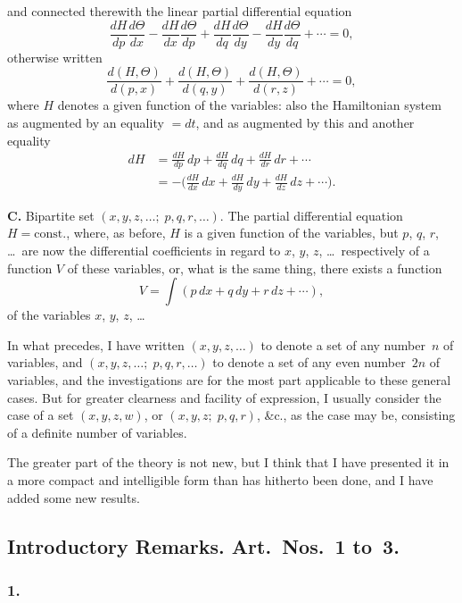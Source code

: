 \documentclass[12pt,a4paper]{article}
\theoremstyle{plain}
\begin{document}
\newpage
\setcounter{page}{114}

and connected therewith the linear partial differential equation
\[
\frac{dH}{dp}\frac{d\Theta}{dx} - \frac{dH}{dx}\frac{d\Theta}{dp} + \frac{dH}{dq}\frac{d\Theta}{dy} - \frac{dH}{dy}\frac{d\Theta}{dq} + \cdots = 0,
\]
otherwise written
\[
\frac{d(H, \Theta)}{d(p, x)} + \frac{d(H, \Theta)}{d(q, y)} + \frac{d(H, \Theta)}{d(r, z)} + \cdots = 0,
\]
where $H$ denotes a given function of the variables: also the Hamiltonian system as augmented by an equality $= dt$, and as augmented by this and another equality
\begin{align*}
dH &= \frac{dH}{dp}\,dp + \frac{dH}{dq}\,dq + \frac{dH}{dr}\,dr + \cdots \\
&= -\biggl(\frac{dH}{dx}\,dx + \frac{dH}{dy}\,dy + \frac{dH}{dz}\,dz + \cdots\biggr).
\end{align*}

\textbf{C.} Bipartite set $(x, y, z, \ldots;\; p, q, r, \ldots)$. The partial differential equation $H = \text{const.}$, where, as before, $H$ is a given function of the variables, but $p$, $q$, $r$, \ldots\ are now the differential coefficients in regard to $x$, $y$, $z$, \ldots\ respectively of a function $V$ of these variables, or, what is the same thing, there exists a function
\[
V = \int(p\,dx + q\,dy + r\,dz + \cdots),
\]
of the variables $x$, $y$, $z$, \ldots

In what precedes, I have written $(x, y, z, \ldots)$ to denote a set of any number~$n$ of variables, and $(x, y, z, \ldots;\; p, q, r, \ldots)$ to denote a set of any even number~$2n$ of variables, and the investigations are for the most part applicable to these general cases. But for greater clearness and facility of expression, I usually consider the case of a set $(x, y, z, w)$, or $(x, y, z;\; p, q, r)$, \&c., as the case may be, consisting of a definite number of variables.

The greater part of the theory is not new, but I think that I have presented it in a more compact and intelligible form than has hitherto been done, and I have added some new results.

\subsection*{Introductory Remarks. Art.~Nos.~1 to~3.}

\subsubsection*{1.}
\end{document}
